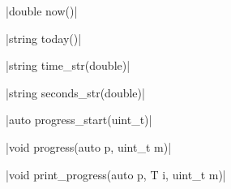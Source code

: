 \funcitem \cppinline|double now()| 

\funcitem \cppinline|string today()| 

\funcitem \cppinline|string time_str(double)| 

\funcitem \cppinline|string seconds_str(double)| 

\funcitem \cppinline|auto progress_start(uint_t)| 

\cppinline|void progress(auto p, uint_t m)| 

\cppinline|void print_progress(auto p, T i, uint_t m)| 
